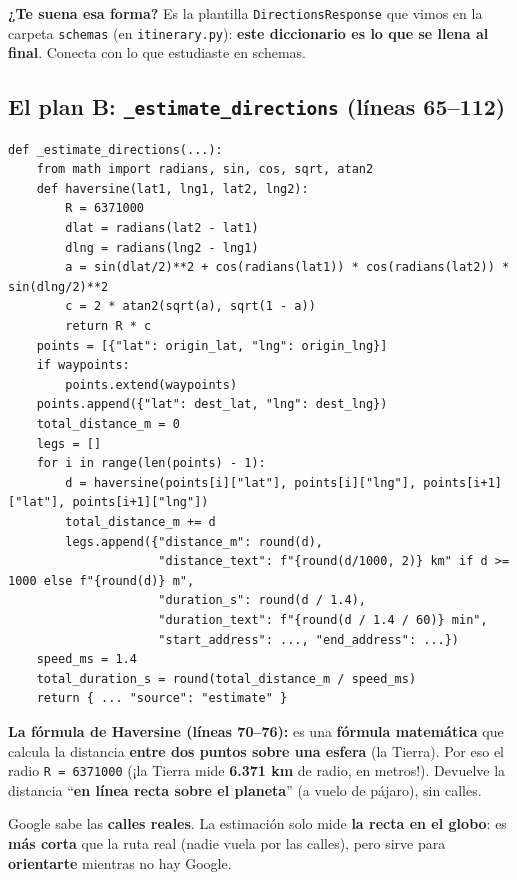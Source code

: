 \documentclass[11pt,a4paper]{article}
\begin{document}
\textbf{¿Te suena esa forma?} Es la plantilla \texttt{DirectionsResponse} que vimos en la
carpeta \texttt{schemas} (en \texttt{itinerary.py}): \textbf{este diccionario es lo que se
llena al final}. Conecta con lo que estudiaste en schemas.

\subsection{El plan B: \texttt{\_estimate\_directions} (líneas 65--112)}

\begin{lstlisting}
def _estimate_directions(...):
    from math import radians, sin, cos, sqrt, atan2
    def haversine(lat1, lng1, lat2, lng2):
        R = 6371000
        dlat = radians(lat2 - lat1)
        dlng = radians(lng2 - lng1)
        a = sin(dlat/2)**2 + cos(radians(lat1)) * cos(radians(lat2)) * sin(dlng/2)**2
        c = 2 * atan2(sqrt(a), sqrt(1 - a))
        return R * c
    points = [{"lat": origin_lat, "lng": origin_lng}]
    if waypoints:
        points.extend(waypoints)
    points.append({"lat": dest_lat, "lng": dest_lng})
    total_distance_m = 0
    legs = []
    for i in range(len(points) - 1):
        d = haversine(points[i]["lat"], points[i]["lng"], points[i+1]["lat"], points[i+1]["lng"])
        total_distance_m += d
        legs.append({"distance_m": round(d),
                     "distance_text": f"{round(d/1000, 2)} km" if d >= 1000 else f"{round(d)} m",
                     "duration_s": round(d / 1.4),
                     "duration_text": f"{round(d / 1.4 / 60)} min",
                     "start_address": ..., "end_address": ...})
    speed_ms = 1.4
    total_duration_s = round(total_distance_m / speed_ms)
    return { ... "source": "estimate" }
\end{lstlisting}

\textbf{La fórmula de Haversine (líneas 70--76):} es una \textbf{fórmula matemática} que
calcula la distancia \textbf{entre dos puntos sobre una esfera} (la Tierra). Por eso el radio
\texttt{R = 6371000} (¡la Tierra mide \textbf{6.371 km} de radio, en metros!). Devuelve la
distancia ``\textbf{en línea recta sobre el planeta}'' (a vuelo de pájaro), sin calles.

\begin{analogia}
Google sabe las \textbf{calles reales}. La estimación solo mide \textbf{la recta en el globo}:
es \textbf{más corta} que la ruta real (nadie vuela por las calles), pero sirve para
\textbf{orientarte} mientras no hay Google.
\end{analogia}
\end{document}
